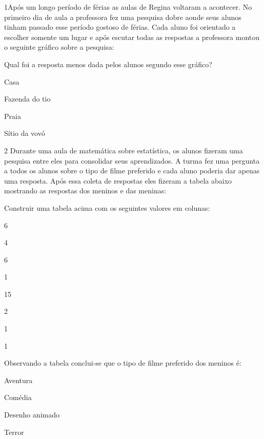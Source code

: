 
\num{1}Após um longo período de férias as aulas de Regina voltaram a
acontecer. No primeiro dia de aula a professora fez uma pesquisa dobre
aonde seus alunos tinham passado esse período gostoso de férias. Cada
aluno foi orientado a escolher somente um lugar e após escutar todas as
respostas a professora montou o seguinte gráfico sobre a pesquisa:


Qual foi a resposta menos dada pelos alunos segundo esse gráfico?

\begin{escolha}
\item
  Casa
\item
  Fazenda do tio
\item
  Praia
\item
  Sítio da vovó
\end{escolha}


\num{2} Durante uma aula de matemática sobre estatística, os alunos fizeram
uma pesquisa entre eles para consolidar seus aprendizados. A turma fez
uma pergunta a todos os alunos sobre o tipo de filme preferido e cada
aluno poderia dar apenas uma resposta. Após essa coleta de respostas
eles fizeram a tabela abaixo mostrando as respostas dos meninos e das
meninas:


Construir uma tabela acima com os seguintes valores em colunas:

\begin{multicols}{2}
6

4

6

1

\columnbreak

 15

 2

 1

 1
\end{multicols} 

Observando a tabela conclui-se que o tipo de filme preferido dos meninos
é:

\begin{escolha}
\item
  Aventura
\item
  Comédia
\item
  Desenho animado
\item
  Terror
\end{escolha}

